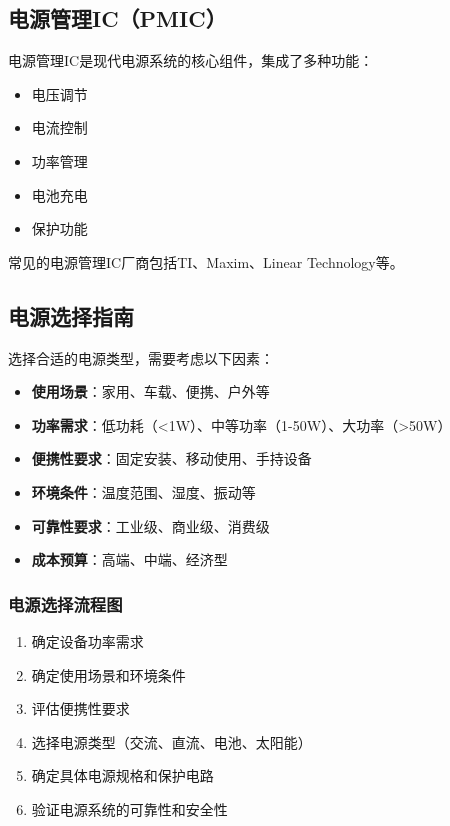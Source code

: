 \documentclass[12pt,UTF8]{ctexbook}
\begin{document}
\subsection{电源管理IC（PMIC）}

电源管理IC是现代电源系统的核心组件，集成了多种功能：
\begin{itemize}
    \item 电压调节
    \item 电流控制
    \item 功率管理
    \item 电池充电
    \item 保护功能
\end{itemize}

常见的电源管理IC厂商包括TI、Maxim、Linear Technology等。

\subsection{电源选择指南}

选择合适的电源类型，需要考虑以下因素：

\begin{itemize}
    \item \textbf{使用场景}：家用、车载、便携、户外等
    \item \textbf{功率需求}：低功耗（<1W）、中等功率（1-50W）、大功率（>50W）
    \item \textbf{便携性要求}：固定安装、移动使用、手持设备
    \item \textbf{环境条件}：温度范围、湿度、振动等
    \item \textbf{可靠性要求}：工业级、商业级、消费级
    \item \textbf{成本预算}：高端、中端、经济型
\end{itemize}

\subsubsection{电源选择流程图}

\begin{enumerate}
    \item 确定设备功率需求
    \item 确定使用场景和环境条件
    \item 评估便携性要求
    \item 选择电源类型（交流、直流、电池、太阳能）
    \item 确定具体电源规格和保护电路
    \item 验证电源系统的可靠性和安全性
\end{enumerate}
\end{document}
